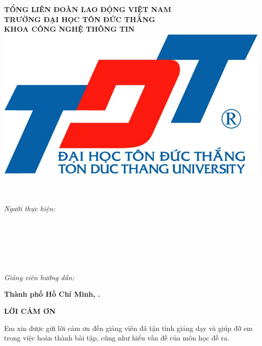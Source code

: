 \begin{center}
	\large{\textbf{TỔNG LIÊN ĐOÀN LAO ĐỘNG VIỆT NAM}} \\
	\large{\textbf{TRƯỜNG ĐẠI HỌC TÔN ĐỨC THẮNG}} \\
	\large{\textbf{KHOA CÔNG NGHỆ THÔNG TIN}} \\\vspace*{1cm}	
	\includegraphics[width=0.5\linewidth]{lib/TDTlogo.jpg}\\\vspace*{1cm}	
	\uppercase{\Large{\textbf{\bai}}\\\vspace*{0.3cm}		
	\LARGE{\textbf{\de}}\\\vspace*{2cm}}
\begin{flushright}			
	\large{\textit{Người thực hiện:}} \\
		\large{\textbf{\tacgia}}\\
	\large{\textbf{\mstacgia}}\\
	\large{\textbf{\svhai}} \\
	\large{\textbf{\msvhai}}\\
	\large{\textbf{\svba}}\\
	\large{\textbf{\msvba}}\\

	\large{\textit{Giảng viên hướng dẫn:}} \\
	\large{\textbf{\gvhd}} 
	\vspace*{2cm}
\end{flushright}
	\large{\textbf{Thành phố Hồ Chí Minh, \nam.}}
\end{center}	
	\newpage
\begin{center}
	\Large{\textbf{LỜI CẢM ƠN}}
\end{center}
	Em xin được gửi lời cảm ơn đến giảng viên \gvhd \mbox{} đã tận tình giảng dạy và giúp đỡ em trong việc hoàn thành bài tập, cũng như hiểu vấn đề của môn học đề ra.\\
	
